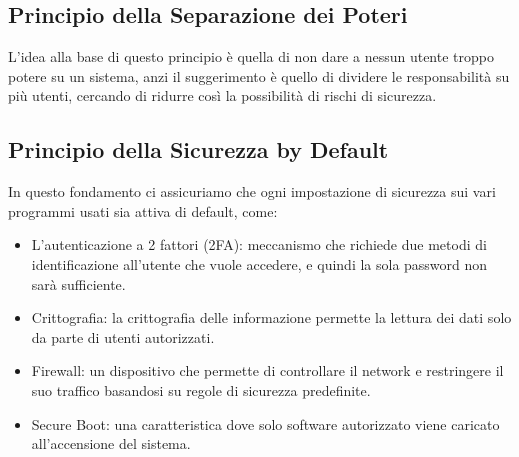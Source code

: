         \subsection{Principio della Separazione dei Poteri}
            L'idea alla base di questo principio è quella di non dare a nessun utente troppo potere su un sistema, anzi il suggerimento è quello di dividere le responsabilità su più utenti, cercando di ridurre così la possibilità di rischi di sicurezza.

        \subsection{Principio della Sicurezza by Default}
            In questo fondamento ci assicuriamo che ogni impostazione di sicurezza sui vari programmi usati sia attiva di default, come:
            \begin{samepage}
                \begin{itemize}
                    \item L'autenticazione a 2 fattori (2FA): meccanismo che richiede due metodi di identificazione all'utente che vuole accedere, e quindi la sola password non sarà sufficiente.
                    \item Crittografia: la crittografia delle informazione permette la lettura dei dati solo da parte di utenti autorizzati.
                    \item Firewall: un dispositivo che permette di controllare il network e restringere il suo traffico basandosi su regole di sicurezza predefinite.
                    \item Secure Boot: una caratteristica dove solo software autorizzato viene caricato all'accensione del sistema.
                \end{itemize}
            \end{samepage}

